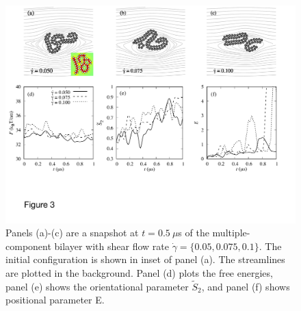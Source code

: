 \documentclass[prb,preprint,showpacs,preprintnumbers,amsmath,amssymb,longbibliography]{revtex4-1}
\begin{document}
\begin{figure}
  \begin{center}
   \includegraphics[width=1.0\textwidth]{Figures/Figure3.pdf}
  \end{center}
  \caption{
    \label{fig:BC1_shear}
    Panels (a)-(c) are a snapshot at $t=0.5\ \mu$s of the multiple-component bilayer
    with shear flow rate $\dot \gamma = \{0.05, 0.075, 0.1\}$.
    The initial configuration is shown in inset of panel (a).
    The streamlines are plotted in the background.
    Panel (d) plots the free energies,
    panel (e) shows the orientational parameter $\tilde{S}_2$,
    and panel (f) shows positional parameter E.
}
\end{figure}
\end{document}
